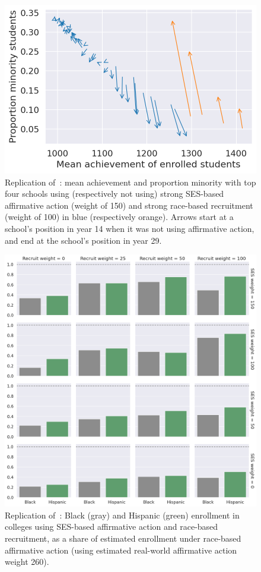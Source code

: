 \begin{figure}
  \centering
  \includegraphics[width=.75\linewidth]{figures/fig3A.png}
  \caption{Replication of~\cite[Figure~3 (left), p.~17]{reardon2018levels}: mean achievement and proportion minority with top four schools using (respectively not using) strong SES-based affirmative action (weight of 150) and strong race-based recruitment (weight of 100) in \colorbox{sns-blue}{blue} (respectively \colorbox{sns-orange}{orange}). 
  Arrows start at a school's position in year 14 when it was not using affirmative action, and end at the school's position in year 29.}
  \label{fig:3a}
\end{figure}

\begin{figure}
  \centering
  \includegraphics[width=.75\linewidth]{figures/fig2.png}
  \caption{Replication of~\cite[Figure~2, p.~15]{reardon2018levels}: Black (\colorbox{sns-gray}{gray}) and Hispanic (\colorbox{sns-green}{green}) enrollment in colleges using SES-based affirmative action and race-based recruitment, as a share of estimated enrollment under race-based affirmative action (using estimated real-world affirmative action weight 260).}
  \label{fig:2}
\end{figure}

